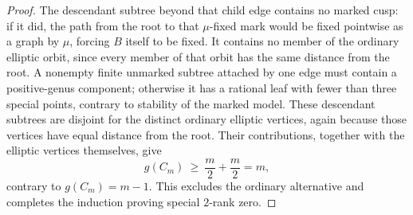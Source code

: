 \begin{proof}
The descendant subtree beyond that child edge contains no marked
cusp: if it did, the path from the root to that \(\mu\)-fixed
mark would be fixed pointwise as a graph by \(\mu\), forcing
\(B\) itself to be fixed. It contains no member of the ordinary
elliptic orbit, since every member of that orbit has the same
distance from the root. A nonempty finite unmarked subtree
attached by one edge must contain a positive-genus component;
otherwise it has a rational leaf with fewer than three special
points, contrary to stability of the marked model. These
descendant subtrees are disjoint for the distinct ordinary
elliptic vertices, again because those vertices have equal
distance from the root. Their contributions, together with
the elliptic vertices themselves, give
\[
             g(C_m)\ \ge\ \frac m2+\frac m2=m,
                                                        \tag{A.69.9}
\]
contrary to \(g(C_m)=m-1\). This excludes the ordinary
alternative and completes the induction proving special
\(2\)-rank zero.


\end{proof}
